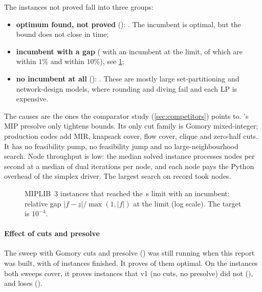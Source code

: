 The instances not proved fall into three groups:
\begin{itemize}
  \item \textbf{optimum found, not proved} (\nMipFoundNotProved): \mipFoundNotProvedNames. The incumbent is
        optimal, but the bound does not close in time;
  \item \textbf{incumbent with a gap} (\nMipIncumbent{} with an incumbent at the limit, of which
        \nMipGapBelowOnePct{} are within $1\%$ and \nMipGapBelowTenPct{} within $10\%$), see \cref{fig:gaps};
  \item \textbf{no incumbent at all} (\nMipNoIncumbent): \mipNoIncumbentNames. These are mostly
        large set-partitioning and network-design models, where rounding and diving fail and each LP is
        expensive.
\end{itemize}
The causes are the ones the comparator study (\cref{sec:competitors}) points to. \nirnay{}'s MIP presolve
only tightens bounds. Its only cut family is Gomory mixed-integer; production codes add MIR, knapsack
cover, flow cover, clique and zero-half cuts. It has no feasibility pump, no feasibility jump and no
large-neighbourhood search. Node throughput is low: the median solved instance processes
\mipNodesPerSec{} nodes per second at a median of \mipLpItersPerNode{} dual iterations per node, and
each node pays the Python overhead of the simplex driver. The largest search on record took
\maxNodesMip{} nodes.

\begin{figure}[tbp]
\centering
{}
\caption[MIPLIB 3: gap at the time limit]{MIPLIB~3 instances that reached the \tlMip\,s limit with an
incumbent: relative gap $|f-\underline z|/\max(1,|f|)$ at the limit (log scale). The target is $10^{-4}$.}
\label{fig:gaps}
\end{figure}

\ifnum{}
\paragraph{Effect of cuts and presolve} The sweep with Gomory cuts and presolve
(\file{\mipNewerFile})\ifnum{} was still running when this report was built, with
\mipNewerDone{} of \nMiplibFiles{} instances finished\fi. It proves \mipNewerSolved{} of them optimal.
On the \nMipCommon{} instances both sweeps cover, it proves \nMipCutsGained{} instances that v1 (no
cuts, no presolve) did not (\mipGainedNames), and loses \nMipCutsLost{} (\mipLostNames).
\fi

